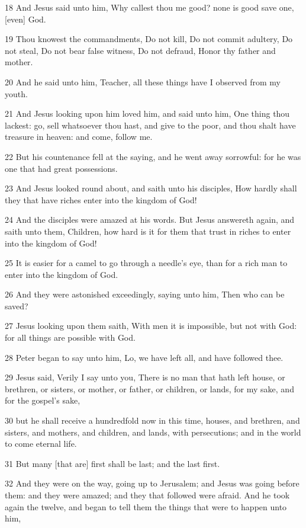 \par 18 And Jesus said unto him, Why callest thou me good? none is good save one, [even] God.
\par 19 Thou knowest the commandments, Do not kill, Do not commit adultery, Do not steal, Do not bear false witness, Do not defraud, Honor thy father and mother.
\par 20 And he said unto him, Teacher, all these things have I observed from my youth.
\par 21 And Jesus looking upon him loved him, and said unto him, One thing thou lackest: go, sell whatsoever thou hast, and give to the poor, and thou shalt have treasure in heaven: and come, follow me.
\par 22 But his countenance fell at the saying, and he went away sorrowful: for he was one that had great possessions.
\par 23 And Jesus looked round about, and saith unto his disciples, How hardly shall they that have riches enter into the kingdom of God!
\par 24 And the disciples were amazed at his words. But Jesus answereth again, and saith unto them, Children, how hard is it for them that trust in riches to enter into the kingdom of God!
\par 25 It is easier for a camel to go through a needle's eye, than for a rich man to enter into the kingdom of God.
\par 26 And they were astonished exceedingly, saying unto him, Then who can be saved?
\par 27 Jesus looking upon them saith, With men it is impossible, but not with God: for all things are possible with God.
\par 28 Peter began to say unto him, Lo, we have left all, and have followed thee.
\par 29 Jesus said, Verily I say unto you, There is no man that hath left house, or brethren, or sisters, or mother, or father, or children, or lands, for my sake, and for the gospel's sake,
\par 30 but he shall receive a hundredfold now in this time, houses, and brethren, and sisters, and mothers, and children, and lands, with persecutions; and in the world to come eternal life.
\par 31 But many [that are] first shall be last; and the last first.
\par 32 And they were on the way, going up to Jerusalem; and Jesus was going before them: and they were amazed; and they that followed were afraid. And he took again the twelve, and began to tell them the things that were to happen unto him,
